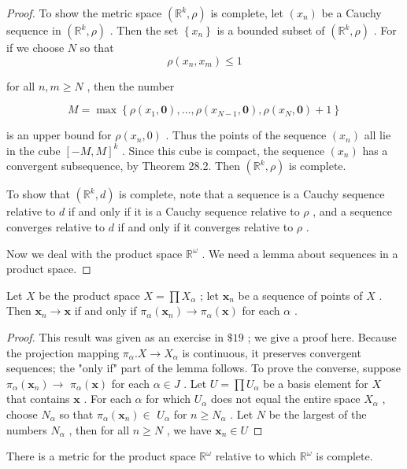 \begin{proof}To show the metric space \(\left( {{\mathbb{R}}^{k},\rho }\right)\) is complete, let \(\left( {x}_{n}\right)\) be a Cauchy sequence in \(\left( {{\mathbb{R}}^{k},\rho }\right)\) . Then the set \(\left\{  {x}_{n}\right\}\) is a bounded subset of \(\left( {{\mathbb{R}}^{k},\rho }\right)\) . For if we choose \(N\) so that
\[
\rho \left( {{x}_{n},{x}_{m}}\right)  \leq  1
\]

for all \(n,m \geq  N\) , then the number

\[
M = \max \left\{  {\rho \left( {{x}_{1},\mathbf{0}}\right) ,\ldots ,\rho \left( {{x}_{N - 1},\mathbf{0}}\right) ,\rho \left( {{x}_{N},\mathbf{0}}\right)  + 1}\right\}
\]

is an upper bound for \(\rho \left( {{x}_{n},0}\right)\) . Thus the points of the sequence \(\left( {x}_{n}\right)\) all lie in the cube \({\left\lbrack  -M,M\right\rbrack  }^{k}\) . Since this cube is compact, the sequence \(\left( {x}_{n}\right)\) has a convergent subsequence, by Theorem 28.2. Then \(\left( {{\mathbb{R}}^{k},\rho }\right)\) is complete.

To show that \(\left( {{\mathbb{R}}^{k},d}\right)\) is complete, note that a sequence is a Cauchy sequence relative to \(d\) if and only if it is a Cauchy sequence relative to \(\rho\) , and a sequence converges relative to \(d\) if and only if it converges relative to \(\rho\) .

Now we deal with the product space \({\mathbb{R}}^{\omega }\) . We need a lemma about sequences in a product space.
\end{proof}
\begin{lemma} Let \(X\) be the product space \(X = \prod {X}_{\alpha }\) ; let \({\mathbf{x}}_{n}\) be a sequence of points of \(X\) . Then \({\mathbf{x}}_{n} \rightarrow  \mathbf{x}\) if and only if \({\pi }_{\alpha }\left( {\mathbf{x}}_{n}\right)  \rightarrow  {\pi }_{\alpha }\left( \mathbf{x}\right)\) for each \(\alpha\) .
\end{lemma}

\begin{proof}This result was given as an exercise in \(\$ {19}\) ; we give a proof here. Because the projection mapping \({\pi }_{\alpha }.X \rightarrow  {X}_{\alpha }\) is continuous, it preserves convergent sequences; the "only if" part of the lemma follows. To prove the converse, suppose \({\pi }_{\alpha }\left( {\mathbf{x}}_{n}\right)  \rightarrow\)  \({\pi }_{\alpha }\left( \mathbf{x}\right)\) for each \(\alpha  \in  J\) . Let \(U = \prod {U}_{\alpha }\) be a basis element for \(X\) that contains \(\mathbf{x}\) . For each \(\alpha\) for which \({U}_{\alpha }\) does not equal the entire space \({X}_{\alpha }\) , choose \({N}_{\alpha }\) so that \({\pi }_{\alpha }\left( {\mathbf{x}}_{n}\right)  \in\)  \({U}_{\alpha }\) for \(n \geq  {N}_{\alpha }\) . Let \(N\) be the largest of the numbers \({N}_{\alpha }\) , then for all \(n \geq  N\) , we have \({\mathbf{x}}_{n} \in  U\)\end{proof}
\begin{theorem} There is a metric for the product space \({\mathbb{R}}^{\omega }\) relative to which \({\mathbb{R}}^{\omega }\) is complete.
\end{theorem}

